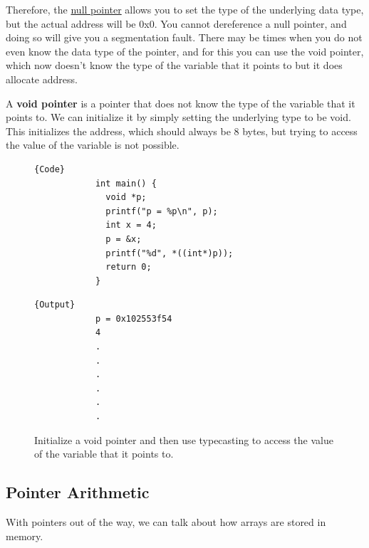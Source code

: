 \documentclass{article}
\newcounter{definition}[section]
\begin{document}
      Therefore, the \hyperref[def:null-pointer]{null pointer} allows you to set the type of the underlying data type, but the actual address will be 0x0. You cannot dereference a null pointer, and doing so will give you a segmentation fault. There may be times when you do not even know the data type of the pointer, and for this you can use the void pointer, which now doesn't know the type of the variable that it points to but it does allocate address. 

      \begin{definition}
        \label{def:void-pointer}
        A \textbf{void pointer} is a pointer that does not know the type of the variable that it points to. We can initialize it by simply setting the underlying type to be void. This initializes the address, which should always be 8 bytes, but trying to access the value of the variable is not possible. 
        \begin{figure}[H]
          \centering 
          \noindent\begin{minipage}{.5\textwidth}
          \begin{lstlisting}[]{Code}
            int main() { 
              void *p; 
              printf("p = %p\n", p); 
              int x = 4; 
              p = &x; 
              printf("%d", *((int*)p));
              return 0; 
            }
          \end{lstlisting}
          \end{minipage}
          \hfill
          \begin{minipage}{.49\textwidth}
          \begin{lstlisting}[]{Output}
            p = 0x102553f54
            4 
            .
            .
            .
            .
            .
            .
          \end{lstlisting}
          \end{minipage}
          \caption{Initialize a void pointer and then use typecasting to access the value of the variable that it points to. } 
          \label{fig:initialize_void_pointer}
        \end{figure}
      \end{definition}

  \subsection{Pointer Arithmetic} 

    With pointers out of the way, we can talk about how arrays are stored in memory. 
\end{document}
